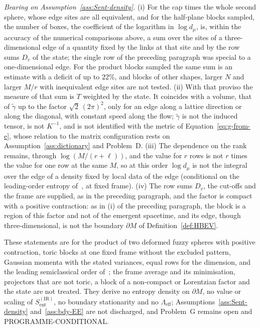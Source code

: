 \emph{Bearing on Assumption~\ref{ass:Sent-density}.} (i) For the cap times the whole second sphere, whose edge sites are all equivalent, and for the half-plane blocks sampled, the number of boxes, the coefficient of the logarithm in \(\log d_\mu\), is, within the accuracy of the numerical comparisons above, a sum over the sites of a three-dimensional edge of a quantity fixed by the links at that site and by the row sums \(D_v\) of the state; the single row of the preceding paragraph was special to a one-dimensional edge. For the product blocks sampled the same sum is an estimate with a deficit of up to \(22\%\), and blocks of other shapes, larger \(N\) and larger \(M/r\) with inequivalent edge sites are not tested. (ii) With that proviso the measure of that sum is \(T\) weighted by the state. It coincides with a volume, that of \(\tilde\gamma\) up to the factor \(\sqrt2\,(2\pi)^2\), only for an edge along a lattice direction or along the diagonal, with constant speed along the flow; \(\tilde\gamma\) is not the induced tensor, is not \(K^{-1}\), and is not identified with the metric of Equation~\eqref{eq:g-from-e}, whose relation to the matrix configuration rests on Assumption~\ref{ass:dictionary} and Problem~D. (iii) The dependence on the rank remains, through \(\log(M/(r+\ell))\), and the value for \(r\) rows is not \(r\) times the value for one row at the same \(M\), so at this order \(\log d_\mu\) is not the integral over the edge of a density fixed by local data of the edge (conditional on the leading-order entropy of~\cite{FlissFrenkelHartnollSoni2025}, at fixed frame). (iv) The row sums \(D_v\), the cut-offs and the frame are supplied, as in the preceding paragraph, and the factor is compact with a positive contraction: as in (i) of the preceding paragraph, the block is a region of this factor and not of the emergent spacetime, and its edge, though three-dimensional, is not the boundary \(\partial M\) of Definition~\ref{def:HBEV}.

These statements are for the product of two deformed fuzzy spheres with positive contraction, toric blocks at one fixed frame without the excluded pattern, Gaussian momenta with the stated variances, equal rows for the dimension, and the leading semiclassical order of~\cite{FlissFrenkelHartnollSoni2025}; the frame average and its minimisation, projectors that are not toric, a block of a non-compact or Lorentzian factor and the state are not treated. They derive no entropy density on \(\partial M\), no value or scaling of \(S_{\mathrm{ent}}^{\mathrm{(IR)}}\), no boundary stationarity and no \(\Lambda_{\mathrm{eff}}\); Assumptions~\ref{ass:Sent-density} and~\ref{ass:bdy-EE} are not discharged, and Problem~G remains open and PROGRAMME-CONDITIONAL.
